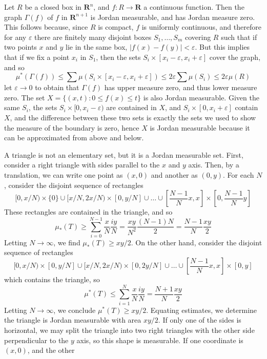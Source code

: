\begin{example}
    Let $R$ be a closed box in $\mathbf{R}^n$, and $f: R \to \mathbf{R}$ a continuous function. Then the graph $\Gamma(f)$ of $f$ in $\mathbf{R}^{n+1}$ is Jordan measurable, and has Jordan measure zero. This follows because, since $R$ is compact, $f$ is uniformly continuous, and therefore for any $\varepsilon$ there are finitely many disjoint boxes $S_1, \dots, S_m$ covering $R$ such that if two points $x$ and $y$ lie in the same box, $|f(x) - f(y)| < \varepsilon$. But this implies that if we fix a point $x_i$ in $S_1$, then the sets $S_i \times [x_i - \varepsilon, x_i + \varepsilon]$ cover the graph, and so
    \[ \mu^*(\Gamma(f)) \leq \sum \mu(S_i \times [x_i - \varepsilon, x_i + \varepsilon]) \leq 2 \varepsilon \sum \mu(S_i) \leq 2\varepsilon \mu(R) \]
    let $\varepsilon \to 0$ to obtain that $\Gamma(f)$ has upper measure zero, and thus lower measure zero. The set $X = \{ (x,t): 0 \leq f(x) \leq t \}$ is also Jordan measurable. Given the same $S_i$, the sets $S_i \times [0,x_i - \varepsilon)$ are contained in $X$, and $S_i \times [0,x_i+\varepsilon]$ contain $X$, and the difference between these two sets is exactly the sets we used to show the measure of the boundary is zero, hence $X$ is Jordan measurable because it can be approximated from above and below.
\end{example}

\begin{example}
    A triangle is not an elementary set, but it is a Jordan measurable set. First, consider a right triangle with sides parallel to the $x$ and $y$ axis. Then, by a translation, we can write one point as $(x,0)$ and another as $(0,y)$. For each $N$, consider the disjoint sequence of rectangles
    \[ [0,x/N) \times \{ 0 \} \cup [x/N, 2x/N) \times [0,y/N] \cup \dots \cup [\frac{N-1}{N} x, x] \times [0, \frac{N-1}{N}y] \]
    These rectangles are contained in the triangle, and so
    \[ \mu_*(T) \geq \sum_{i = 0}^{N-1} \frac{x}{N} \frac{iy}{N} = \frac{xy}{N^2} \frac{(N-1)N}{2} = \frac{N-1}{N} \frac{xy}{2} \]
    Letting $N \to \infty$, we find $\mu_*(T) \geq xy/2$. On the other hand, consider the disjoint sequence of rectangles
    \[ [0,x/N) \times [0,y/N] \cup [x/N, 2x/N) \times [0,2y/N] \cup \dots \cup [\frac{N-1}{N} x, x] \times [0, y] \]
    which contains the triangle, so
    \[ \mu^*(T) \leq \sum_{i = 1}^N \frac{x}{N} \frac{iy}{N} = \frac{N+1}{N} \frac{xy}{2} \]
    Letting $N \to \infty$, we conclude $\mu^*(T) \geq xy/2$. Equating estimates, we determine the triangle is Jordan measurable with area $xy/2$. If only one of the sides is horizontal, we may split the triangle into two right triangles with the other side perpendicular to the $y$ axis, so this shape is measurable. If one coordinate is $(x,0)$, and the other
\end{example}


